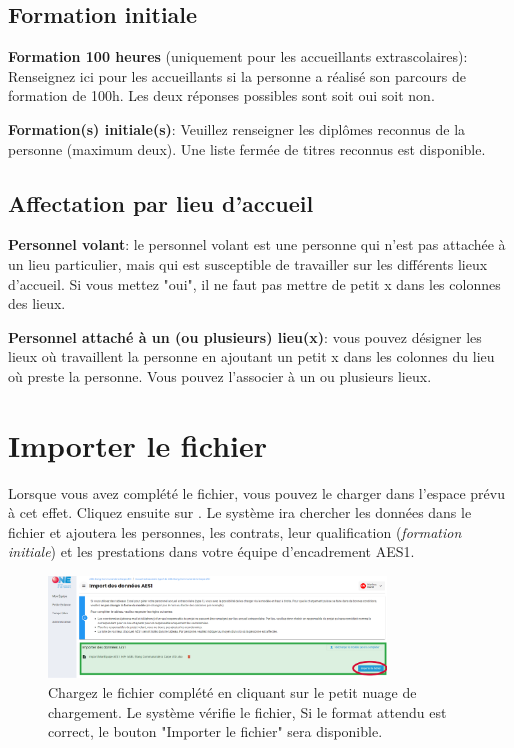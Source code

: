\subsection{Formation initiale}
\textbf{Formation 100 heures} (uniquement pour les accueillants extrascolaires): Renseignez ici pour les accueillants si la personne a réalisé son parcours de formation de 100h. Les deux réponses possibles sont soit oui soit non.


\textbf{Formation(s) initiale(s)}: Veuillez renseigner les diplômes reconnus de la personne (maximum deux). Une liste fermée de titres reconnus est disponible.


\subsection{Affectation par lieu d'accueil}
\textbf{Personnel volant}: le personnel volant est une personne qui n'est pas attachée à un lieu particulier, mais qui est susceptible de travailler sur les différents lieux d'accueil. Si vous mettez "oui", il ne faut pas mettre de petit x dans les colonnes des lieux.

\textbf{Personnel attaché à un (ou plusieurs) lieu(x)}: vous pouvez désigner les lieux où travaillent la personne en ajoutant un petit x dans les colonnes du lieu où preste la personne. Vous pouvez l'associer à un ou plusieurs lieux. 


\section{Importer le fichier}
Lorsque vous avez complété le fichier, vous pouvez le charger dans l'espace prévu à cet effet. Cliquez ensuite sur . Le système ira chercher les données dans le fichier et ajoutera les personnes, les contrats, leur qualification (\textit{formation initiale}) et les prestations dans votre équipe d'encadrement AES1.

\begin{figure}[!h]
    \centering
    \includegraphics[width=0.8\textwidth]{Images/aes/upload_aes1/import_aes1_ok.png}
    \caption{Chargez le fichier complété en cliquant sur le petit nuage de chargement. Le système vérifie le fichier, Si le format attendu est correct, le bouton "Importer le fichier" sera disponible.}
    \label{fig:aes1_modèle_ok}
\end{figure}



